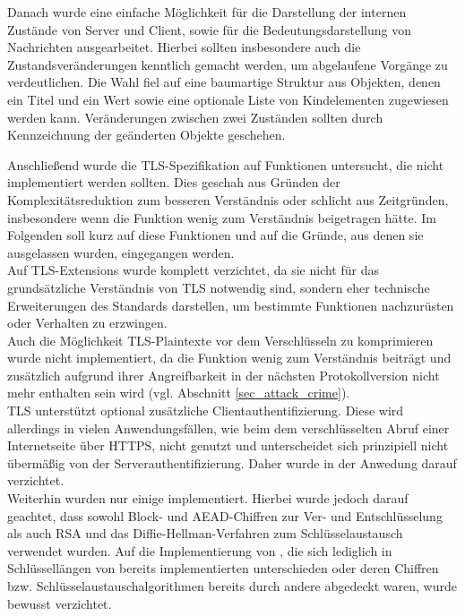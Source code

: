 Danach wurde eine einfache Möglichkeit für die Darstellung der internen Zustände von Server und Client, sowie für die Bedeutungsdarstellung von Nachrichten ausgearbeitet. Hierbei sollten insbesondere auch die Zustandsveränderungen kenntlich gemacht werden, um abgelaufene Vorgänge zu verdeutlichen. Die Wahl fiel auf eine baumartige Struktur aus Objekten, denen ein Titel und ein Wert sowie eine optionale Liste von Kindelementen zugewiesen werden kann. Veränderungen zwischen zwei Zuständen sollten durch Kennzeichnung der geänderten Objekte geschehen. 


Anschließend wurde die TLS-Spezifikation auf Funktionen untersucht, die nicht implementiert werden sollten. Dies geschah aus Gründen der Komplexitätsreduktion zum besseren Verständnis oder schlicht aus Zeitgründen, insbesondere wenn die Funktion wenig zum Verständnis beigetragen hätte. Im Folgenden soll kurz auf diese Funktionen und auf die Gründe, aus denen sie ausgelassen wurden, eingegangen werden.\\
Auf TLS-Extensions wurde komplett verzichtet, da sie nicht für das grundsätzliche Verständnis von TLS notwendig sind, sondern eher technische Erweiterungen des Standards darstellen, um bestimmte Funktionen nachzurüsten oder Verhalten zu erzwingen.\\
Auch die Möglichkeit TLS-Plaintexte vor dem Verschlüsseln zu komprimieren wurde nicht implementiert, da die Funktion wenig zum Verständnis beiträgt und zusätzlich aufgrund ihrer Angreifbarkeit in der nächsten Protokollversion nicht mehr enthalten sein wird (vgl. Abschnitt \ref{sec_attack_crime}).\\
TLS unterstützt optional zusätzliche Clientauthentifizierung. Diese wird allerdings in vielen Anwendungsfällen, wie beim dem verschlüsselten Abruf einer Internetseite über HTTPS, nicht genutzt und unterscheidet sich prinzipiell nicht übermäßig von der Serverauthentifizierung. Daher wurde in der Anwedung darauf verzichtet.\\
Weiterhin wurden nur einige \ciphersuites implementiert. Hierbei wurde jedoch darauf geachtet, dass sowohl Block- und AEAD-Chiffren zur Ver- und Entschlüsselung als auch RSA und das Diffie-Hellman-Verfahren zum Schlüsselaustausch verwendet wurden. Auf die Implementierung von \ciphersuites, die sich lediglich in Schlüssellängen von bereits implementierten \ciphersuites unterschieden oder deren Chiffren bzw. Schlüsselaustauschalgorithmen bereits durch andere \ciphersuites abgedeckt waren, wurde bewusst verzichtet.\\
